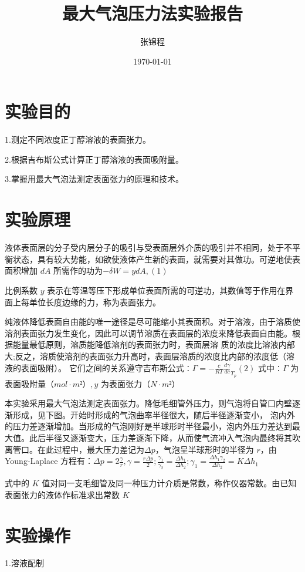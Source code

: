 \documentclass[4pt,a4papper]{article}
\title{\zihao{-2}\textbf{最大气泡压力法实验报告}}
\author{张锦程}
\date{\today}
\begin{document}
\maketitle

\section{实验目的}
1.测定不同浓度正丁醇溶液的表面张力。

2.根据吉布斯公式计算正丁醇溶液的表面吸附量。

3.掌握用最大气泡法测定表面张力的原理和技术。

\section{实验原理}
液体表面层的分子受内层分子的吸引与受表面层外介质的吸引并不相同，处于不平衡状态，具有较大势能，如欲使液体产生新的表面，就需要对其做功。可逆地使表面积增加 $dA$ 所需作的功为$-\delta W = ydA,(1)$ 

比例系数 $y$ 表示在等温等压下形成单位表面所需的可逆功，其数值等于作用在界面上每单位长度边缘的力，称为表面张力。\

纯液体降低表面自由能的唯一途径是尽可能缩小其表面积。对于溶液，由于溶质使溶剂表面张力发生变化，因此可以调节溶质在表面层的浓度来降低表面自由能。根据能量最低原则，溶质能降低溶剂的表面张力时，表面层溶 质的浓度比溶液内部大;反之，溶质使溶剂的表面张力升高时，表面层溶质的浓度比内部的浓度低（溶液的表面吸附）。 它们之间的关系遵守吉布斯公式∶$\Gamma = -\frac{c}{RT}\frac{d\gamma}{dc}_{T_p} (2)$ 式中∶$\Gamma$ 为表面吸附量$（mol·m²）,y$ 为表面张力$（N·m²）$ 

本实验采用最大气泡法测定表面张力。降低毛细管外压力，则气泡将自管口内壁逐渐形成，见下图。开始时形成的气泡曲率半径很大，随后半径逐渐变小， 泡内外的压力差逐渐增加。当形成的气泡刚好是半球形时半径最小，泡内外压力差达到最大值。此后半径又逐渐变大，压力差逐渐下降，从而使气流冲入气泡内最终将其吹离管口。在此过程中，最大压力差记为$\Delta p$，气泡呈半球形时的半径为 $r$，由 Young-Laplace 方程有：$\Delta p = 2\frac{\gamma}{r}, \gamma = \frac{r\Delta p}{2}; \frac{\gamma_1}{\gamma_2} = \frac{\Delta h_1}{\Delta h_2}; \gamma_1 = \frac{\Delta h_1 \gamma_2}{\Delta h_2} = K\Delta h_1$ 

式中的 $K$ 值对同一支毛细管及同一种压力计介质是常数，称作仪器常数。由已知表面张力的液体作标准求出常数 $K$

\section{实验操作}
1.溶液配制
\end{document}
